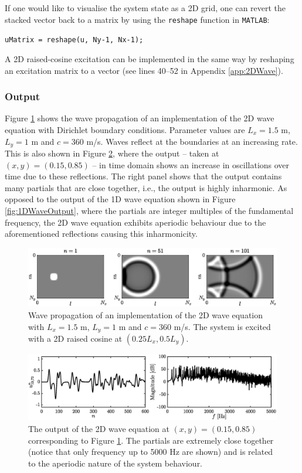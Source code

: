 If one would like to visualise the system state as a 2D grid, one can revert the stacked vector back to a matrix by using the \texttt{reshape} function in \texttt{MATLAB}:
\begin{center}
    \texttt{uMatrix = reshape(u, Ny-1, Nx-1);}
\end{center}
A 2D raised-cosine excitation can be implemented in the same way by reshaping an excitation matrix to a vector (see lines 40--52 in Appendix \ref{app:2DWave}).

\subsubsection{Output}
Figure \ref{fig:2Dpropagation} shows the wave propagation of an implementation of the 2D wave equation with Dirichlet boundary conditions. Parameter values are $L_x = 1.5$ m, $L_y = 1$ m and $c= 360$ m/s. Waves reflect at the boundaries at an increasing rate. This is also shown in Figure \ref{fig:output2DWave}, where the output -- taken at $(x,y) = (0.15, 0.85)$ -- in time domain shows an increase in oscillations over time due to these reflections. The right panel shows that the output contains many partials that are close together, i.e., the output is highly inharmonic. As opposed to the output of the 1D wave equation shown in Figure \ref{fig:1DWaveOutput}, where the partials are integer multiples of the fundamental frequency, the 2D wave equation exhibits aperiodic behaviour due to the aforementioned reflections causing this inharmonicity.

\begin{figure}[h]
    \centering
    \includegraphics[width=\textwidth]{figures/resonators/2d/twoDPropagation.eps}
    \caption{Wave propagation of an implementation of the 2D wave equation with $L_x = 1.5$ m, $L_y = 1$ m and $c= 360$ m/s. The system is excited with a 2D raised cosine at $(0.25L_x, 0.5L_y)$.\label{fig:2Dpropagation}}
\end{figure}

\begin{figure}[h]
    \centering
    \includegraphics[width=\textwidth]{figures/resonators/2d/output2Dwave.eps}
    \caption{The output of the 2D wave equation at $(x,y) = (0.15, 0.85)$ corresponding to Figure \ref{fig:2Dpropagation}. The partials are extremely close together (notice that only frequency up to 5000 Hz are shown) and is related to the aperiodic nature of the system behaviour. \label{fig:output2DWave}}
\end{figure}

